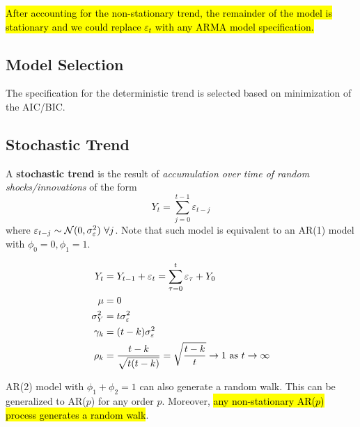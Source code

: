 \documentclass[11pt]{article}
\begin{document}
    		\begin{remark}
    		    \hl{After accounting for the non-stationary trend, the remainder of the model is stationary and we could replace $\varepsilon_t$ with any ARMA model specification.}
    		 \end{remark}
    		
    	\subsection{Model Selection}
    		\begin{remark}
    		    The specification for the deterministic trend is selected based on minimization of the AIC/BIC.
    		\end{remark}

    	\subsection{Stochastic Trend}
    	    \begin{definition}
    	        A \textbf{stochastic trend} is the result of \emph{accumulation over time of random shocks/innovations} of the form
    	        \begin{equation}
    	            Y_t = \sum_{j=0}^{t-1} \varepsilon_{t-j}
    	        \end{equation}
    	        where $\varepsilon_{t-j} \sim \mathcal{{N}}(0, \sigma_\varepsilon^2)\ \forall j$. Note that such model is equivalent to an AR(1) model with $\phi_0 = 0, \phi_1 = 1$.
    	    \end{definition}
    	    
    	    \begin{example}
    	        \begin{align}
    	            Y_t &= Y_{t-1} + \varepsilon_t = \sum_{\tau=0}^{t} \varepsilon_\tau + Y_0 \\
    	            \mu &= 0 \\
    	            \sigma_Y^2 &= t \sigma_\varepsilon^2 \\
    	            \gamma_k &= (t-k) \sigma_\varepsilon^2 \\
    	            \rho_k &= \frac{t-k}{\sqrt{t (t-k)}} = \sqrt{\frac{t-k}{t}} \to 1 \text{{ as }} t \to \infty
    	        \end{align}
    	    \end{example}
    	    
    	    \begin{remark}
    	        AR(2) model with $\phi_1 + \phi_2 = 1$ can also generate a random walk. This can be generalized to AR($p$) for any order $p$. Moreover, \hl{any non-stationary AR($p$) process generates a random walk}.
    	    \end{remark}
    	    
\end{document}
